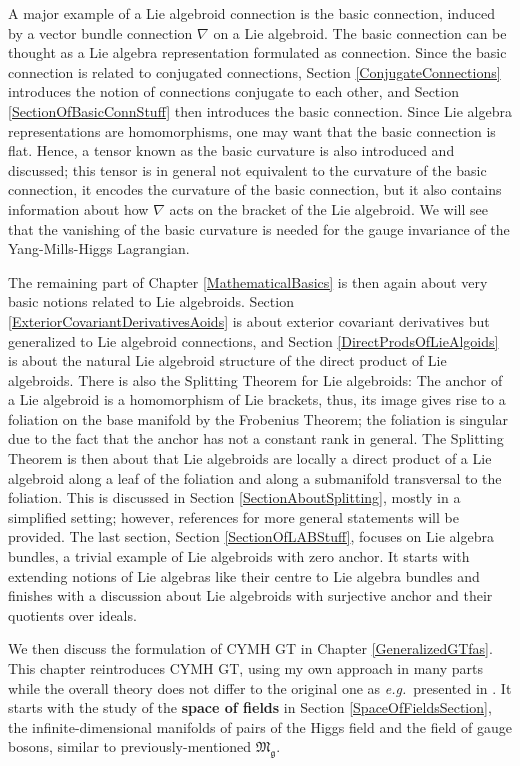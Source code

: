 A major example of a Lie algebroid connection is the basic connection, induced by a vector bundle connection $\nabla$ on a Lie algebroid. The basic connection can be thought as a Lie algebra representation formulated as connection. Since the basic connection is related to conjugated connections, Section \ref{ConjugateConnections} introduces the notion of connections conjugate to each other, and Section \ref{SectionOfBasicConnStuff} then introduces the basic connection. Since Lie algebra representations are homomorphisms, one may want that the basic connection is flat. Hence, a tensor known as the basic curvature is also introduced and discussed; this tensor is in general not equivalent to the curvature of the basic connection, it encodes the curvature of the basic connection, but it also contains information about how $\nabla$ acts on the bracket of the Lie algebroid. We will see that the vanishing of the basic curvature is needed for the gauge invariance of the Yang-Mills-Higgs Lagrangian.

The remaining part of Chapter \ref{MathematicalBasics} is then again about very basic notions related to Lie algebroids. Section \ref{ExteriorCovariantDerivativesAoids} is about exterior covariant derivatives but generalized to Lie algebroid connections, and Section \ref{DirectProdsOfLieAlgoids} is about the natural Lie algebroid structure of the direct product of Lie algebroids. There is also the Splitting Theorem for Lie algebroids: The anchor of a Lie algebroid is a homomorphism of Lie brackets, thus, its image gives rise to a foliation on the base manifold by the Frobenius Theorem; the foliation is singular due to the fact that the anchor has not a constant rank in general. The Splitting Theorem is then about that Lie algebroids are locally a direct product of a Lie algebroid along a leaf of the foliation and along a submanifold transversal to the foliation. This is discussed in Section \ref{SectionAboutSplitting}, mostly in a simplified setting; however, references for more general statements will be provided. The last section, Section \ref{SectionOfLABStuff}, focuses on Lie algebra bundles, a trivial example of Lie algebroids with zero anchor. It starts with extending notions of Lie algebras like their centre to Lie algebra bundles and finishes with a discussion about Lie algebroids with surjective anchor and their quotients over ideals.

We then discuss the formulation of CYMH GT in Chapter \ref{GeneralizedGTfas}. This chapter reintroduces CYMH GT, using my own approach in many parts while the overall theory does not differ to the original one as \textit{e.g.}~presented in \cite{CurvedYMH}. It starts with the study of the \textbf{space of fields} in Section \ref{SpaceOfFieldsSection}, the infinite-dimensional manifolds of pairs of the Higgs field and the field of gauge bosons, similar to previously-mentioned $\mathfrak{M}_{\mathfrak{g}}$.

